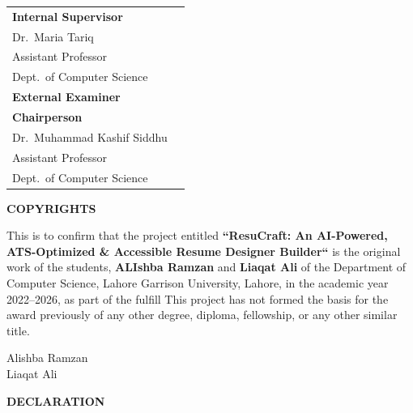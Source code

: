 \documentclass[12pt, a4paper, oneside]{report}
\begin{document}
\vspace{2cm}
\noindent
\begin{tabular}{p{7cm} p{5cm}}
  \textbf{Internal Supervisor} & \\[0.3cm]
  Dr.\ Maria Tariq             & \underline{\hspace{5cm}} \\
  Assistant Professor          & \\
  Dept.\ of Computer Science   & \\[1.5cm]
  \textbf{External Examiner}   & \underline{\hspace{5cm}} \\[1.5cm]
  \textbf{Chairperson}         & \\[0.3cm]
  Dr.\ Muhammad Kashif Siddhu  & \underline{\hspace{5cm}} \\
  Assistant Professor          & \\
  Dept.\ of Computer Science   & \\
\end{tabular}

\newpage
\thispagestyle{empty}
\begin{center}
  {\Large \textbf{COPYRIGHTS}}
\end{center}

This is to confirm that the project entitled \textbf{``ResuCraft: An AI-Powered, ATS-Optimized \& Accessible Resume Designer Builder``} is the original work of the students, \textbf{ALIshba Ramzan} and \textbf{Liaqat Ali} of the Department of Computer Science, Lahore Garrison University, Lahore, in the academic year 2022--2026, as part of the fulfill This project has not formed the basis for the award previously of any other degree, diploma, fellowship, or any other similar title.

\vspace{1.5cm}
\noindent Alishba Ramzan \hfill \underline{\hspace{5cm}}\\[0.8cm]
Liaqat Ali \hfill \underline{\hspace{5cm}}

\newpage
\thispagestyle{empty}
\begin{center}
  {\Large \textbf{DECLARATION}}
\end{center}
\end{document}
